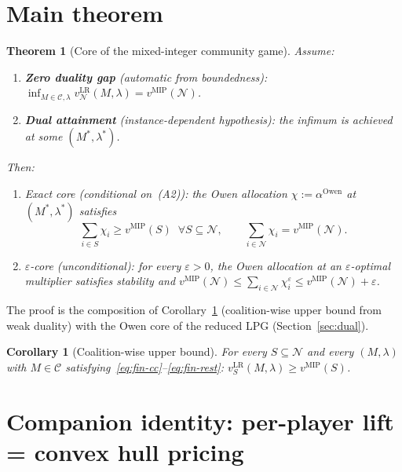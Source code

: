 \documentclass[11pt]{article}
\newtheorem{theorem}{Theorem}
\newtheorem{corollary}{Corollary}
\theoremstyle{definition}
\newcommand{\COP}{\mathcal{C}}
\newcommand{\N}{\mathcal{N}}
\newcommand{\vmip}{v^{\mathrm{MIP}}}
\newcommand{\vlr}{v^{\mathrm{LR}}}
\begin{document}
\section{Main theorem}
\label{sec:theorem}

\begin{theorem}[Core of the mixed-integer community game]
\label{thm:main}
Assume:
\begin{enumerate}[label=\textup{(A\arabic*)}]
\item \textbf{Zero duality gap} (automatic from boundedness):
  $\inf_{M\in\COP,\lambda}\vlr_\N(M,\lambda)=\vmip(\N)$.
\item \textbf{Dual attainment} (instance-dependent hypothesis):
  the infimum is achieved at some $(M^{*},\lambda^{*})$.
\end{enumerate}
Then:
\begin{enumerate}[label=\textup{(\roman*)}]
\item \emph{Exact core} (conditional on~\textup{(A2)}):
  the Owen allocation $\chi:=\alpha^{\mathrm{Owen}}$ at
  $(M^{*},\lambda^{*})$ satisfies
  \[
  \sum_{i\in S}\chi_i\ge\vmip(S)\;\;\forall S\subseteq\N,
  \qquad\sum_{i\in\N}\chi_i=\vmip(\N).
  \]
\item \emph{$\varepsilon$-core} (unconditional): for every
  $\varepsilon>0$, the Owen allocation at an $\varepsilon$-optimal
  multiplier satisfies stability and
  $\vmip(\N)\le\sum_{i\in\N}\chi^{\varepsilon}_i
  \le\vmip(\N)+\varepsilon$.
\end{enumerate}
\end{theorem}

The proof is the composition of Corollary~\ref{cor:upper} (coalition-wise
upper bound from weak duality) with the Owen core of the reduced LPG
(Section~\ref{sec:dual}).

\begin{corollary}[Coalition-wise upper bound]
\label{cor:upper}
For every $S\subseteq\N$ and every $(M,\lambda)$ with $M\in\COP$
satisfying~\eqref{eq:fin-cc}--\eqref{eq:fin-rest}:
$\vlr_S(M,\lambda)\ge\vmip(S)$.
\end{corollary}

\section{Companion identity: per-player lift = convex hull pricing}
\label{sec:chp}
\end{document}
